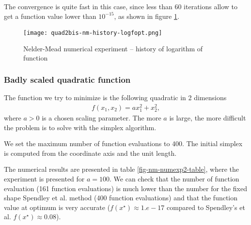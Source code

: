 The convergence is quite fast in this case, since less than 60 iterations
allow to get a function value lower than $10^{-15}$, as shown in 
figure \ref{fig-nm-numexp1-logfopt}.

\begin{figure}
\begin{center}
\texttt{[image: quad2bis-nm-history-logfopt.png]}
\end{center}
\caption{Nelder-Mead numerical experiment -- history of logarithm of function}
\label{fig-nm-numexp1-logfopt}
\end{figure}

\subsubsection{Badly scaled quadratic function}

The function we try to minimize is the following quadratic 
in 2 dimensions 
\begin{eqnarray}
\label{quadratic-nm-function2}
f(x_1,x_2) = a x_1^2 + x_2^2,
\end{eqnarray}
where $a>0$ is a chosen scaling parameter. 
The more $a$ is large, the more difficult the problem is 
to solve with the simplex algorithm.

We set the maximum number of function evaluations to 400.
The initial simplex is computed from the coordinate axis and the unit length.

The numerical results are presented in table \ref{fig-nm-numexp2-table},
where the experiment is presented for $a=100$. We can check that the 
number of function evaluation (161 function evaluations) is much lower than the number 
for the fixed shape Spendley et al. method (400 function evaluations)
and that the function value at optimum is very accurate ($f(x^\star)\approx 1.e-17$
compared to Spendley's et al. $f(x^\star) \approx 0.08$).

